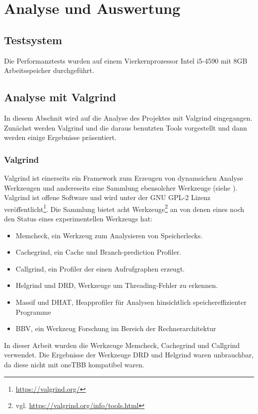 \chapter{Analyse und Auswertung}\label{analysis}


\section{Testsystem}

Die Performanztests wurden auf einem Vierkernprozessor Intel i5-4590 mit 8GB Arbeitsspeicher durchgeführt.


\section{Analyse mit Valgrind}

In diesem Abschnit wird auf die Analyse des Projektes mit Valgrind eingegangen. Zunächst werden Valgrind und die daraus benutzten Tools vorgestellt und dann werden einige Ergebnisse präsentiert.
\subsection{Valgrind}

Valgrind ist einerseits ein Framework zum Erzeugen von dynamsichen Analyse Werkzeugen und andereseits eine Sammlung ebensolcher Werkzeuge (siehe \cite{10.1145/1250734.1250746}). 
Valgrind ist offene Software und wird unter der GNU GPL-2 Lizenz veröffentlicht\footnote{\url{https://valgrind.org/}}.
Die Sammlung bietet acht Werkzeuge\footnote{vgl. \url{https://valgrind.org/info/tools.html}} an von denen eines noch den Status eines experimentellen Werkzeugs hat:
\begin{itemize}
  \item Memcheck, ein Werkzeug zum Analysieren von Speicherlecks.
  \item Cachegrind, ein Cache und Branch-prediction Profiler.
  \item Callgrind, ein Profiler der einen Aufrufgraphen erzeugt.
  \item Helgrind und DRD, Werkzeuge um Threading-Fehler zu erkennen.
  \item Massif und DHAT, Heapprofiler für Analysen hinsichtlich speichereffizienter Programme 
  \item BBV, ein Werkzeug Forschung im Bereich der Rechnerarchitektur
\end{itemize}

In dieser Arbeit wurden die Werkzeuge Memcheck, Cachegrind und Callgrind verwendet. Die Ergebnisse der Werkzeuge DRD und Helgrind waren unbrauchbar, da diese nicht mit oneTBB kompatibel waren.

